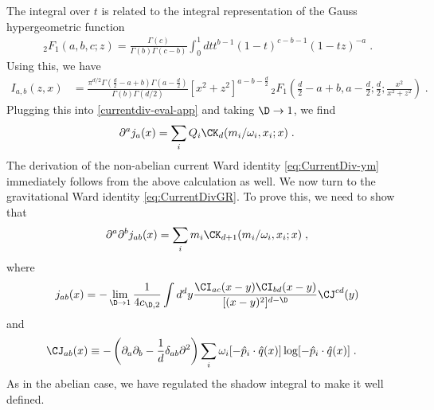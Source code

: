 \documentclass[11pt]{article}
\def\d{{\delta}}
\def\G{{\Gamma}}
\def\o{{\omega}}
\def\p{{\partial}}
\begin{document}
The integral over $t$ is related to the integral representation of the Gauss hypergeometric function
\begin{equation}
\begin{split}
\label{hgf}
\,_2 F_1(a,b,c;z)=\frac{\G(c)}{\G(b)\G(c-b)} \int_0^1 dt t^{b-1}(1-t)^{c-b-1}(1-tz)^{-a} \; . 
\end{split}
\end{equation}
Using this, we  have
\begin{equation}
\begin{split}\label{intab-eval}
I_{a,b}(z,x) &= \frac{ \pi^{d/2}\G ( \frac{d}{2} - a + b )  \G ( a-\frac{d}{2} )  }{ \G(b) \G ( d / 2 ) }  [ x^2  +  z^2    ]^{a - b - \frac{d}{2} } \,_2 F_1 \left( \frac{d}{2}-a+b , a - \frac{d}{2} ; \frac{d}{2} ; \frac{ x^2 }{ x^2 + z^2 } \right) \; . 
\end{split}
\end{equation}
Plugging this into \eqref{currentdiv-eval-app} and taking $\D \to 1$, we find
\begin{equation}
\begin{split}
\p^a j_a(x) =   \sum_i Q_i \CK_d ( m_i / \o_i , x_i ; x ) \; . 
\end{split}
\end{equation}
The derivation of the non-abelian current Ward identity \eqref{eq:CurrentDiv-ym} immediately follows from the above calculation as well. We now turn to the gravitational Ward identity \eqref{eq:CurrentDivGR}. To prove this, we need to show that
\begin{equation}
\begin{split}
\p^a \p^b j_{ab} (x) = \sum_i m_i \CK_{d+1} ( m_i / \o_i , x_i ; x ) \; , 
\end{split}
\end{equation}
where
\begin{equation}
\begin{split}\label{pab-def-reg}
j_{ab}(x) = - \lim_{\D \to 1} \frac{1}{4c_{\D,2}}  \int d^d y \frac{ \CI_{ac}(x-y) \CI_{bd} ( x - y ) }{[( x - y )^2]^{d-\D} } \CJ^{cd} (y) 
\end{split}
\end{equation}
and
\begin{equation}
\begin{split}\label{app-Jabdef}
\CJ_{ab}(x) &\equiv - \left( \p_a \p_b - \frac{1}{d} \d_{ab} \p^2 \right) \sum_i \o_i [ - {\hat p}_i \cdot {\hat q}(x) ]  \log [ - {\hat p}_i \cdot {\hat q}(x) ] \;  .
\end{split}
\end{equation}
As in the abelian case, we have regulated the shadow integral to make it well defined.
\end{document}
